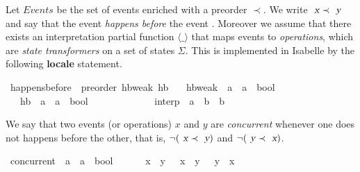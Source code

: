 \documentclass[acmlarge,review,anonymous]{acmart}\settopmatter{printfolios=true}
\begin{document}
Let $\mathit{Events}$ be the set of events enriched with a preorder $\prec$. We
write $\isa{x} \prec \isa{y}$ and say that the event  \emph{happens
before} the event .  Moreover we assume that there exists an
interpretation partial function $\langle\_\rangle$ that maps events to
\emph{operations}, which are \emph{state transformers} on a set of states
$\Sigma$.  This is implemented in Isabelle by the following \textbf{locale}
statement.

\begin{isabellebody}
  \isanewline
{}\isamarkupfalse%
\ happens{\isacharunderscore}before\ {\isacharequal}\ preorder\ hb{\isacharunderscore}weak\ hb\isanewline
\ \ \ hb{\isacharunderscore}weak\ {\isacharcolon}{\isacharcolon}\ {\isachardoublequoteopen}{\isacharprime}a\ {\isasymRightarrow}\ {\isacharprime}a\ {\isasymRightarrow}\ bool{\isachardoublequoteclose}\ \ {\isacharparenleft}\ {\isachardoublequoteopen}{\isasympreceq}{\isachardoublequoteclose}\ {}{}{\isacharparenright}\isanewline
\ \ \ hb\ {\isacharcolon}{\isacharcolon}\ {\isachardoublequoteopen}{\isacharprime}a\ {\isasymRightarrow}\ {\isacharprime}a\ {\isasymRightarrow}\ bool{\isachardoublequoteclose}\ \ \ \ \ \ \ {\isacharparenleft}\ {\isachardoublequoteopen}{\isasymprec}{\isachardoublequoteclose}\ {}{}{\isacharparenright}\ {\isacharplus}\isanewline
\ \ \ interp\ {\isacharcolon}{\isacharcolon}\ {\isachardoublequoteopen}{\isacharprime}a\ {\isasymRightarrow}\ {\isacharprime}b\ {\isasymrightharpoonup}\ {\isacharprime}b{\isachardoublequoteclose}\ {\isacharparenleft}{\isachardoublequoteopen}{\isasymlangle}{\isacharunderscore}{\isasymrangle}{\isachardoublequoteclose}\ {\isacharbrackleft}{}{\isacharbrackright}\ {}{}{}{}{\isacharparenright}\isanewline
\end{isabellebody}

We say that two events (or operations) $x$ and $y$ are \emph{concurrent}
whenever one does not happens before the other, that is, $\neg (\isa{x} \prec
\isa{y})$ and $\neg (\isa{y} \prec \isa{x})$.

\begin{isabellebody}
  \isanewline
{}\isamarkupfalse%
\ concurrent\ {\isacharcolon}{\isacharcolon}\ {\isachardoublequoteopen}{\isacharprime}a\ {\isasymRightarrow}\ {\isacharprime}a\ {\isasymRightarrow}\ bool{\isachardoublequoteclose}\ {\isacharparenleft}\ {\isachardoublequoteopen}{\isasymparallel}{\isachardoublequoteclose}\ {}{}{\isacharparenright}\ \isanewline
\ \ {\isachardoublequoteopen}x\ {\isasymparallel}\ y\ {\isasymequiv}\ {\isasymnot}\ {\isacharparenleft}x\ {\isasymprec}\ y{\isacharparenright}\ {\isasymand}\ {\isasymnot}\ {\isacharparenleft}y\ {\isasymprec}\ x{\isacharparenright}{\isachardoublequoteclose}\isanewline
\end{isabellebody}
\end{document}

